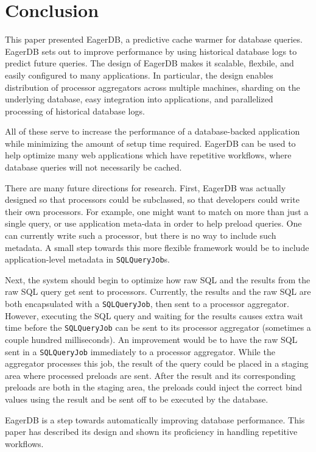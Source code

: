 \documentclass[12pt]{article}
\begin{document}
\section{Conclusion}

This paper presented EagerDB, a predictive cache warmer for database queries. EagerDB sets out to improve performance by using historical database logs to predict future queries. The design of EagerDB makes it scalable, flexbile, and easily configured to many applications. In particular, the design enables distribution of processor aggregators across multiple machines, sharding on the underlying database, easy integration into applications, and parallelized processing of historical database logs.

All of these serve to increase the performance of a database-backed application while minimizing the amount of setup time required. EagerDB can be used to help optimize many web applications which have repetitive workflows, where database queries will not necessarily be cached.

There are many future directions for research. First, EagerDB was actually designed so that processors could be subclassed, so that developers could write their own processors. For example, one might want to match on more than just a single query, or use application meta-data in order to help preload queries. One can currently write such a processor, but there is no way to include such metadata. A small step towards this more flexible framework would be to include application-level metadata in \texttt{SQLQueryJob}s.

Next, the system should begin to optimize how raw SQL and the results from the raw SQL query get sent to processors. Currently, the results and the raw SQL are both encapsulated with a \texttt{SQLQueryJob}, then sent to a processor aggregator. However, executing the SQL query and waiting for the results causes extra wait time before the \texttt{SQLQueryJob} can be sent to its processor aggregator (sometimes a couple hundred milliseconds). An improvement would be to have the raw SQL sent in a \texttt{SQLQueryJob} immediately to a processor aggregator. While the aggregator processes this job, the result of the query could be placed in a staging area where processed preloads are sent. After the result and its corresponding preloads are both in the staging area, the preloads could inject the correct bind values using the result and be sent off to be executed by the database.

EagerDB is a step towards automatically improving database performance. This paper has described its design and shown its proficiency in handling repetitive workflows.
\end{document}
